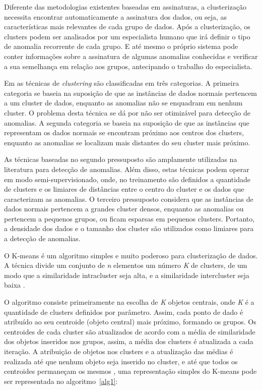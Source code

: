 \indent Diferente das metodologias existentes baseadas em assinaturas, a clusterização necessita encontrar automaticamente a assinatura dos dados, ou seja, as características mais relevantes de cada grupo de dados. Após a clusterização, os clusters podem ser analisados por um especialista humano que irá definir o tipo de anomalia recorrente de cada grupo. E até mesmo o próprio sistema pode conter informações sobre a assinatura de algumas anomalias conhecidas e verificar a sua semelhança em relação aos grupos, antecipando o trabalho do especialista.

\indent Em  as técnicas de \textit{clustering} são classificadas em três categorias. A primeira categoria se baseia na suposição de que as instâncias de dados normais pertencem a um cluster de dados, enquanto as anomalias não se enquadram em nenhum cluster. O problema desta técnica se dá por não ser otimizável para detecção de anomalias. A segunda categoria se baseia na suposição de que as instâncias que representam os dados normais se encontram próximo aos centros dos clusters, enquanto as anomalias se localizam mais distantes do seu cluster mais próximo.

\ident As técnicas baseadas no segundo pressuposto são amplamente utilizadas na literatura para detecção de anomalias. Além disso, estas técnicas podem operar em modo semi-supervisionado, onde, no treinamento são definidos a quantidade de clusters e os limiares de distâncias entre o centro do cluster e os dados que caracterizam as anomalias. O terceiro pressuposto considera que as instâncias de dados normais pertencem a grandes cluster densos, enquanto as anomalias ou pertencem a pequenos grupos, ou ficam esparsas em pequenos clusters. Portanto, a densidade dos dados e o tamanho dos cluster são utilizados como limiares para a detecção de anomalias.

\indent O K-means é um algoritmo simples e muito poderoso para clusterização de dados. A técnica divide um conjunto de \textit{n} elementos um número \textit{K} de clusters, de um modo que a similaridade intracluster seja alta, e a similaridade intercluster seja baixa \cite{goldschmidt2005}.

\indent O algoritmo consiste primeiramente na escolha de \textit{K} objetos centrais, onde \textit{K} é a quantidade de clusters definidos por parâmetro. Assim, cada ponto de dado é atribuído ao seu centroide (objeto central) mais próximo, formando os grupos. Os centroides de cada cluster são atualizados de acordo com a média de similaridade dos objetos inseridos nos grupos, assim, a média dos clusters é atualizada a cada iteração. A atribuição de objetos nos clusters e a atualização das médias é realizada até que nenhum objeto seja inserido no cluster, e até que todos os centroides permaneçam os mesmos \cite{Tan2005}, uma representação simples do K-means pode ser representada no algoritmo~\ref{alg1}:
\vspace{0.4cm}

